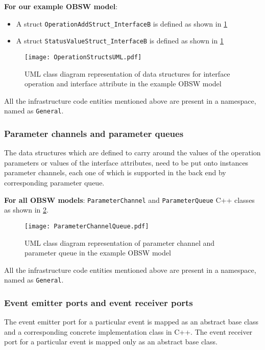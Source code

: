 \textbf{For our example OBSW model}:
\begin{itemize}
\item A struct \texttt{OperationAdd\allowbreak Struct\_\allowbreak InterfaceB} is defined as shown in \cref{fig: Operation structs UML}
\item A struct \texttt{StatusValue\allowbreak Struct\_\allowbreak InterfaceB} is defined as shown in \cref{fig: Operation structs UML}
\end{itemize} 

\begin{figure}[h]
	\centering
	\texttt{[image: OperationStructsUML.pdf]}
	\caption{UML class diagram representation of data structures for interface operation and interface attribute in the example OBSW model}
	\label{fig: Operation structs UML}
\end{figure} 

All the infrastructure code entities mentioned above are present in a namespace, named as \texttt{General}.

\subsubsection{\textbf{Parameter channels and parameter queues}}
The data structures which are defined to carry around the values of the operation parameters or values of the interface attributes, need to be put onto instances parameter channels, each one of which is supported in the back end by corresponding parameter queue.

\textbf{For all OBSW models}: \texttt{Parameter\allowbreak Channel} and \texttt{Parameter\allowbreak Queue} C++ classes as shown in \cref{fig: Parameter channel UML}. 

\begin{figure}[h]
	\centering
	\texttt{[image: ParameterChannelQueue.pdf]}
	\caption{UML class diagram representation of parameter channel and parameter queue in the example OBSW model}
	\label{fig: Parameter channel UML}
\end{figure}

All the infrastructure code entities mentioned above are present in a namespace, named as \texttt{General}.   

\subsubsection{\textbf{Event emitter ports and event receiver ports}}
The event emitter port for a particular event is mapped as an abstract base class and a corresponding concrete implementation class in C++. The event receiver port for a particular event is mapped only as an abstract base class.  

